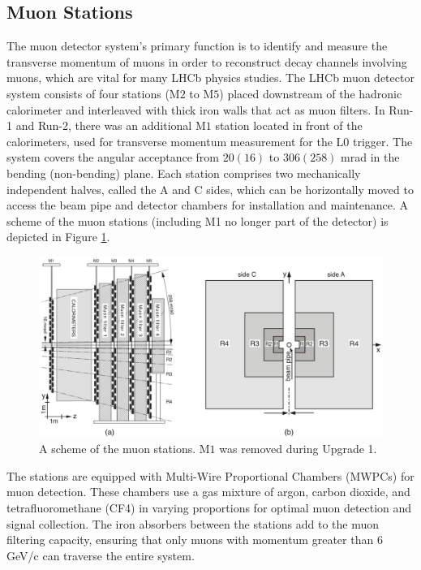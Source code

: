 \subsection{Muon Stations}

The muon detector system's primary function is to identify and measure the transverse momentum of muons in order to reconstruct decay channels involving muons, which are vital for many LHCb physics studies.
The LHCb muon detector system\cite{Alves_2013} consists of four stations (M$2$ to M$5$) placed downstream of the hadronic calorimeter and interleaved with thick iron walls that act as muon filters. In Run-1 and Run-2, there was an additional M$1$ station located in front of the calorimeters, used for transverse momentum measurement for the L$0$ trigger\cite{muon_upgrade}. The system covers the angular acceptance from $20 (16)$ to $306 (258)$ mrad in the bending (non-bending) plane. Each station comprises two mechanically independent halves, called the A and C sides, which can be horizontally moved to access the beam pipe and detector chambers for installation and maintenance.
A scheme of the muon stations (including M1 no longer part of the detector) is depicted in Figure \ref{fig:muon}.
\begin{figure}
    \centering
    \includegraphics[width=\textwidth]{figures/muon.png}
    \caption{A scheme of the muon stations. M$1$ was removed during Upgrade 1.}
    \label{fig:muon}
\end{figure}
The stations are equipped with Multi-Wire Proportional Chambers (MWPCs) for muon detection. These chambers use a gas mixture of argon, carbon dioxide, and tetrafluoromethane (CF4) in varying proportions for optimal muon detection and signal collection. The iron absorbers between the stations add to the muon filtering capacity, ensuring that only muons with momentum greater than $6$ GeV/c can traverse the entire system.

